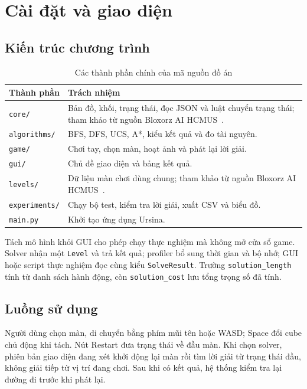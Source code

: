 \section{Cài đặt và giao diện}
\subsection{Kiến trúc chương trình}
\begin{table}[htbp]\centering\small
\caption{Các thành phần chính của mã nguồn đồ án}
\begin{tabularx}{\linewidth}{|p{.31\linewidth}|Y|}
\hline Thành phần & Trách nhiệm\\\hline
\texttt{core/} & Bản đồ, khối, trạng thái, đọc JSON và luật chuyển trạng thái; tham khảo từ nguồn Bloxorz AI HCMUS~\cite{reference-game}.\\\hline
\texttt{algorithms/} & BFS, DFS, UCS, A*, kiểu kết quả và đo tài nguyên.\\\hline
\texttt{game/} & Chơi tay, chọn màn, hoạt ảnh và phát lại lời giải.\\\hline
\texttt{gui/} & Chủ đề giao diện và bảng kết quả.\\\hline
\texttt{levels/} & Dữ liệu màn chơi dùng chung; tham khảo từ nguồn Bloxorz AI HCMUS~\cite{reference-game}.\\\hline
\texttt{experiments/} & Chạy bộ test, kiểm tra lời giải, xuất CSV và biểu đồ.\\\hline
\texttt{main.py} & Khởi tạo ứng dụng Ursina.\\\hline
\end{tabularx}
\end{table}
Tách mô hình khỏi GUI cho phép chạy thực nghiệm mà không mở cửa sổ game. Solver nhận một \texttt{Level} và trả kết quả; profiler bổ sung thời gian và bộ nhớ; GUI hoặc script thực nghiệm đọc cùng kiểu \texttt{SolveResult}. Trường \texttt{solution\_length} tính từ danh sách hành động, còn \texttt{solution\_cost} lưu tổng trọng số đã tính.

\subsection{Luồng sử dụng}
Người dùng chọn màn, di chuyển bằng phím mũi tên hoặc WASD; Space đổi cube chủ động khi tách. Nút Restart đưa trạng thái về đầu màn. Khi chọn solver, phiên bản giao diện đang xét khởi động lại màn rồi tìm lời giải từ trạng thái đầu, không giải tiếp từ vị trí đang chơi. Sau khi có kết quả, hệ thống kiểm tra lại đường đi trước khi phát lại.


